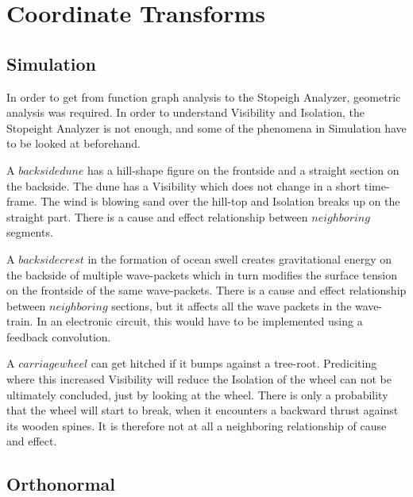 \documentclass{report}
\begin{document}
\chapter{Coordinate Transforms}

\section{Simulation}
In order to get from function graph analysis to the Stopeigh Analyzer, geometric analysis was required. In order to understand Visibility and Isolation, the Stopeight Analyzer is not enough, and some of the phenomena in Simulation have to be looked at beforehand.

A $backside dune$ has a hill-shape figure on the frontside and a straight section on the backside. The dune has a Visibility which does not change in a short time-frame. The wind is blowing sand over the hill-top and Isolation breaks up on the straight part. There is a cause and effect relationship between $neighboring$ segments.

A $backside crest$ in the formation of ocean swell creates gravitational energy on the backside of multiple wave-packets which in turn modifies the surface tension on the frontside of the same wave-packets. There is a cause and effect relationship between $neighboring$ sections, but it affects all the wave packets in the wave-train. In an electronic circuit, this would have to be implemented using a feedback convolution.

A $carriage wheel$ can get hitched if it bumps against a tree-root. Prediciting where this increased Visibility will reduce the Isolation of the wheel can not be ultimately concluded, just by looking at the wheel. There is only a probability that the wheel will start to break, when it encounters a backward thrust against its wooden spines. It is therefore not at all a neighboring relationship of cause and effect.

\section{Orthonormal}
\end{document}
